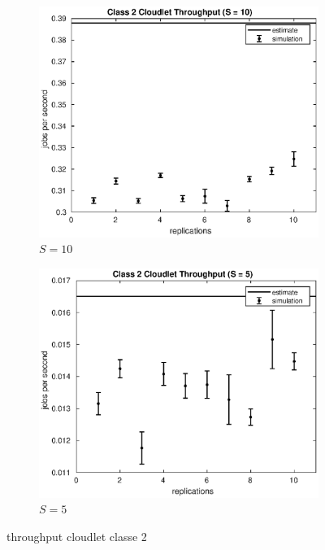 \begin{figure}[!h]
\begin{subfigure}[t]{0.49\textwidth}
\includegraphics[width=\textwidth]{figures/simul/10_500K_x2clet}
\caption{$S = 10$}
\label{10_x2clet}
\end{subfigure}
%
\begin{subfigure}[t]{0.49\textwidth}
\includegraphics[width=\textwidth]{figures/simul/5_500K_x2clet}
\caption{$S = 5$}
\label{5_x2clet}
\end{subfigure}
%
\caption{throughput cloudlet classe 2}
\label{plot:x2clet}
\end{figure}
%
%


